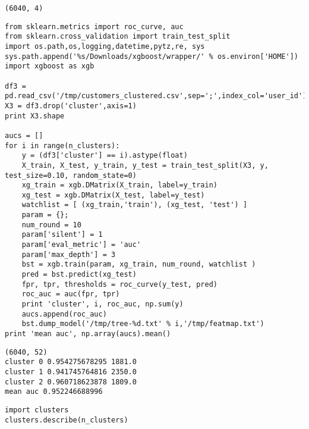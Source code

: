 \documentclass[12pt,fleqn]{article}\usepackage{../common}
\begin{document}
\begin{verbatim}
(6040, 4)
\end{verbatim}

\begin{verbatim}
from sklearn.metrics import roc_curve, auc
from sklearn.cross_validation import train_test_split
import os.path,os,logging,datetime,pytz,re, sys
sys.path.append('%s/Downloads/xgboost/wrapper/' % os.environ['HOME'])
import xgboost as xgb

df3 = pd.read_csv('/tmp/customers_clustered.csv',sep=';',index_col='user_id')
X3 = df3.drop('cluster',axis=1)
print X3.shape

aucs = []
for i in range(n_clusters):
    y = (df3['cluster'] == i).astype(float)    
    X_train, X_test, y_train, y_test = train_test_split(X3, y, test_size=0.10, random_state=0)
    xg_train = xgb.DMatrix(X_train, label=y_train)
    xg_test = xgb.DMatrix(X_test, label=y_test)    
    watchlist = [ (xg_train,'train'), (xg_test, 'test') ]    
    param = {}; 
    num_round = 10
    param['silent'] = 1
    param['eval_metric'] = 'auc'
    param['max_depth'] = 3
    bst = xgb.train(param, xg_train, num_round, watchlist )
    pred = bst.predict(xg_test)
    fpr, tpr, thresholds = roc_curve(y_test, pred)
    roc_auc = auc(fpr, tpr)
    print 'cluster', i, roc_auc, np.sum(y)
    aucs.append(roc_auc)
    bst.dump_model('/tmp/tree-%d.txt' % i,'/tmp/featmap.txt')
print 'mean auc', np.array(aucs).mean()
\end{verbatim}

\begin{verbatim}
(6040, 52)
cluster 0 0.954275678295 1881.0
cluster 1 0.941745764816 2350.0
cluster 2 0.960718623878 1809.0
mean auc 0.952246688996
\end{verbatim}

\begin{verbatim}
import clusters
clusters.describe(n_clusters)
\end{verbatim}
\end{document}
